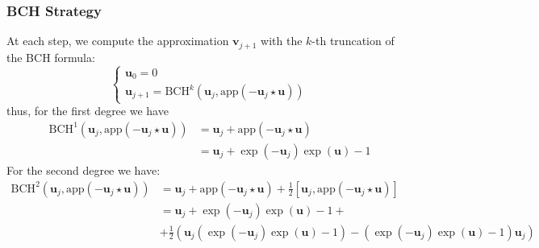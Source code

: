 \subsubsection{BCH Strategy}
At each step, we compute the approximation $\mathbf{v}_{j+1}$ with the $k$-th truncation of the BCH formula:
\begin{equation}\label{eq:bossa_strat}
\begin{cases}
\mathbf{u}_0 = 0 \\
\mathbf{u}_{j+1} = \text{BCH}^{k}(\mathbf{u}_{j}, \text{app}(-\mathbf{u}_{j}  \star  \mathbf{u} ))
\end{cases}
\end{equation}
thus, for the first degree we have 
\begin{align*}
\text{BCH}^{1}(\mathbf{u}_{j}, \text{app}(-\mathbf{u}_{j}  \star  \mathbf{u} ))
&=
\mathbf{u}_{j} +  \text{app}(-\mathbf{u}_{j}  \star  \mathbf{u} )\\
&=
\mathbf{u}_{j} + \exp(-\mathbf{u}_{j}) \exp( \mathbf{u})  - 1
\end{align*}
For the second degree we have:
\begin{align*}
\text{BCH}^{2}(\mathbf{u}_{j}, \text{app}(-\mathbf{u}_{j}  \star  \mathbf{u} ))
&=
\mathbf{u}_{j} +  \text{app}(-\mathbf{u}_{j}  \star  \mathbf{u} ) + \frac{1}{2}[\mathbf{u}_{j},  \text{app}(-\mathbf{u}_{j}  \star  \mathbf{u} )]\\
&=
\mathbf{u}_{j} + \exp(-\mathbf{u}_{j}) \exp( \mathbf{u})  - 1 + \\
&+ \frac{1}{2}(  \mathbf{u}_{j}( \exp(-\mathbf{u}_{j}) \exp( \mathbf{u})  - 1) -  ( \exp(-\mathbf{u}_{j}) \exp( \mathbf{u})  - 1)\mathbf{u}_{j})
\end{align*}


